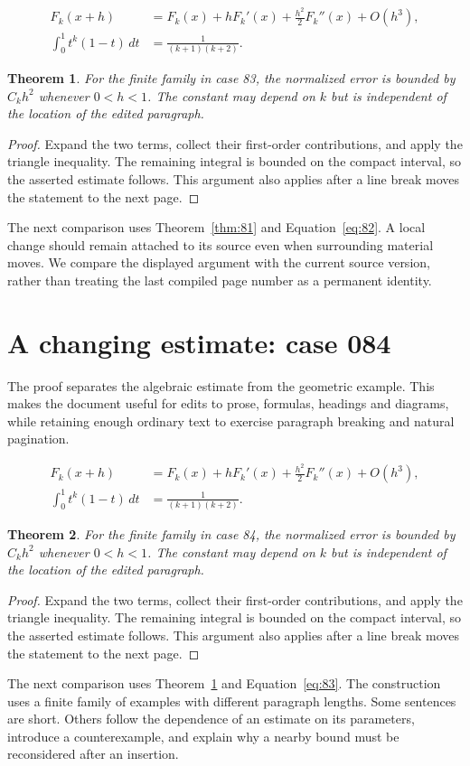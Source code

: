 \documentclass[a4paper,10pt]{article}
\newtheorem{theorem}{Theorem}[section]
\begin{document}
\lipsum[7-8]
\begin{align}\label{eq:82}
 F_k(x+h)&=F_k(x)+hF_k'(x)+\frac{h^2}{2}F_k''(x)+O(h^3),\\
 \int_0^1 t^k(1-t)\,dt&=\frac{1}{(k+1)(k+2)}.
\end{align}
\begin{theorem}\label{thm:82}
For the finite family in case 83, the normalized error is bounded by $C_k h^2$ whenever $0<h<1$. The constant may depend on $k$ but is independent of the location of the edited paragraph.
\end{theorem}
\begin{proof}
Expand the two terms, collect their first-order contributions, and apply the
triangle inequality. The remaining integral is bounded on the compact interval,
so the asserted estimate follows. This argument also applies after a line break
moves the statement to the next page.
\end{proof}
The next comparison uses Theorem~\ref{thm:81} and Equation~\ref{eq:82}. A local change should remain attached to its source even when surrounding material moves. We compare the displayed argument with the current source version, rather than treating the last compiled page number as a permanent identity.

\lipsum[13]

\section{A changing estimate: case 084}\label{unit:83}
The proof separates the algebraic estimate from the geometric example. This makes the document useful for edits to prose, formulas, headings and diagrams, while retaining enough ordinary text to exercise paragraph breaking and natural pagination.

\lipsum[10-11]
\begin{align}\label{eq:83}
 F_k(x+h)&=F_k(x)+hF_k'(x)+\frac{h^2}{2}F_k''(x)+O(h^3),\\
 \int_0^1 t^k(1-t)\,dt&=\frac{1}{(k+1)(k+2)}.
\end{align}
\begin{theorem}\label{thm:83}
For the finite family in case 84, the normalized error is bounded by $C_k h^2$ whenever $0<h<1$. The constant may depend on $k$ but is independent of the location of the edited paragraph.
\end{theorem}
\begin{proof}
Expand the two terms, collect their first-order contributions, and apply the
triangle inequality. The remaining integral is bounded on the compact interval,
so the asserted estimate follows. This argument also applies after a line break
moves the statement to the next page.
\end{proof}
The next comparison uses Theorem~\ref{thm:82} and Equation~\ref{eq:83}. The construction uses a finite family of examples with different paragraph lengths. Some sentences are short. Others follow the dependence of an estimate on its parameters, introduce a counterexample, and explain why a nearby bound must be reconsidered after an insertion.
\end{document}
